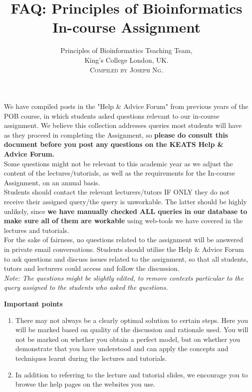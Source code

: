 \documentclass[10pt,a4paper]{article}
\begin{document}
\title{FAQ: Principles of Bioinformatics \\ In-course Assignment}
\author{Principles of Bioinformatics Teaching Team, \\ King's College London, UK. \\  \textsc{Compiled by Joseph Ng.}}
\maketitle

We have compiled posts in the "Help \& Advice Forum" from previous years of the POB course, in which students asked questions relevant to our in-course assignment. We believe this collection addresses queries most students will have as they proceed in completing the Assignment, so \textbf{please do consult this document before you post any questions on the KEATS Help \& Advice Forum.}\\

Some questions might not be relevant to this academic year as we adjust the content of the lectures/tutorials, as well as the requirements for the In-course Assignment, on an annual basis. \\

Students should contact the relevant lecturers/tutors IF ONLY they do not receive their assigned query/the query is unworkable. The latter should be highly unlikely, since \textbf{we have manually checked ALL queries in our database to make sure all of them are workable} using web-tools we have covered in the lectures and tutorials. \\

For the sake of fairness, no questions related to the assignment will be answered in private email conversations. Students should utilise the Help \& Advice Forum to ask questions and discuss issues related to the assignment, so that all students, tutors and lecturers could access and follow the discussion.\\

\textit{Note: The questions might be slightly edited, to remove contexts particular to the query assigned to the students who asked the questions.} \newline

\textbf{Important points}
\begin{enumerate}
  \item There may not always be a clearly optimal solution to certain steps. Here you will be marked based on quality of the discussion and rationale used. You will not be marked on whether you obtain a perfect model, but on whether you demonstrate that you have understood and can apply the concepts and techniques learnt during the lectures and tutorials.
  \item In addition to referring to the lecture and tutorial slides, we encourage you to browse the help pages on the websites you use.
\end{enumerate}
\newpage
\end{document}
